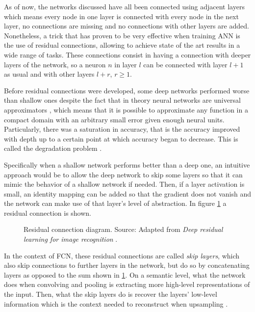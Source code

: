 As of now, the networks discussed have all been connected using adjacent layers which means every node in one layer is connected with every node in the next layer, no connections are missing and no connections with other layers are added. Nonetheless, a trick that has proven to be very effective when training ANN is the use of residual connections, allowing to achieve state of the art results in a wide range of tasks. These connections consist in having a connection with deeper layers of the network, so a neuron $n$ in layer $l$ can be connected with layer $l+1$ as usual and with other layers $l+r$, $r\geq 1$.

Before residual connections were developed, some deep networks performed worse than shallow ones despite the fact that in theory neural networks are universal approximators \cite{Hornik, Cybenko}, which means that it is possible to approximate any function in a compact domain with an arbitrary small error given enough neural units. Particularly, there was a saturation in accuracy, that is the accuracy improved with depth up to a certain point at which accuracy began to decrease. This is called the degradation problem \cite{res-connection}.

Specifically when a shallow network performs better than a deep one, an intuitive approach would be to allow the deep network to skip some layers so that it can mimic the behavior of a shallow network if needed. Then, if a layer activation is small, an identity mapping can be added so that the gradient does not vanish and the network can make use of that layer's level of abstraction. In figure \ref{fig:res-connection} a residual connection is shown. 

\begin{figure}
    \centering
    
    \caption[Residual connection diagram]{Residual connection diagram. Source: Adapted from \textit{Deep residual learning for image recognition} \cite{res-connection}.}
    \label{fig:res-connection}
\end{figure}

In the context of FCN, these residual connections are called \textit{skip layers}, which also skip connections to further layers in the network, but do so by concatenating layers as opposed to the sum shown in \ref{fig:res-connection}. On a semantic level, what the network does when convolving and pooling is extracting more high-level representations of the input. Then, what the skip layers do is recover the layers' low-level information which is the context needed to reconstruct when upsampling \cite{Ronneberger}.